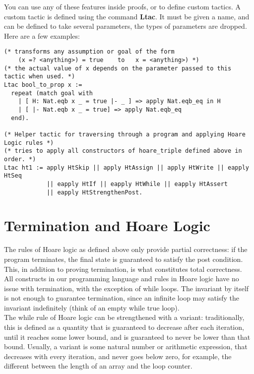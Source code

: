 \documentclass{article}
\begin{document}
You can use any of these features inside proofs, or to define custom tactics. A custom tactic is defined using the command \textbf{Ltac}.
It must be given a name, and can be defined to take several parameters, the types of parameters are dropped. Here are a few examples:

\begin{verbatim}
(* transforms any assumption or goal of the form
    (x =? <anything>) = true    to   x = <anything>) *)
(* the actual value of x depends on the parameter passed to this tactic when used. *)
Ltac bool_to_prop x :=
  repeat (match goal with
    | [ H: Nat.eqb x _ = true |- _ ] => apply Nat.eqb_eq in H
    | [ |- Nat.eqb x _ = true] => apply Nat.eqb_eq
  end).
  
(* Helper tactic for traversing through a program and applying Hoare Logic rules *)
(* tries to apply all constructors of hoare_triple defined above in order. *)
Ltac ht1 := apply HtSkip || apply HtAssign || apply HtWrite || eapply HtSeq
            || eapply HtIf || eapply HtWhile || eapply HtAssert
            || eapply HtStrengthenPost.
\end{verbatim}

\section{Termination and Hoare Logic}
The rules of Hoare logic as defined above only provide partial correctness: if the program terminates, the final state is guaranteed to satisfy the post condition.
This, in addition to proving termination, is what constitutes total correctness. \\

All constructs in our programming language and rules in Hoare logic have no issue with termination, with the exception of while loops. The invariant by itself is not
enough to guarantee termination, since an infinite loop may satisfy the invariant indefinitely (think of an empty while true loop). \\

The while rule of Hoare logic can be strengthened with a variant: traditionally, this is defined as a quantity that is guaranteed to decrease after each iteration, until
it reaches some lower bound, and is guaranteed to never be lower than that bound. Usually, a variant is some natural number or arithmetic expression, that decreases
with every iteration, and never goes below zero, for example, the different between the length of an array and the loop counter. \\
\end{document}
